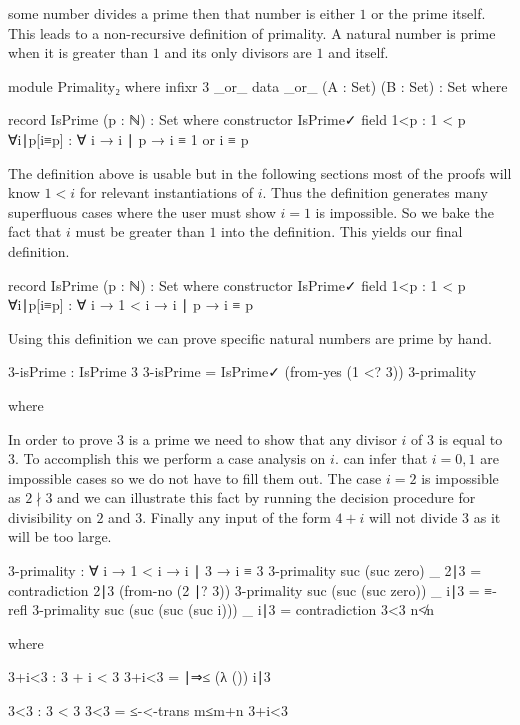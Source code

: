 \documentclass[./Thesis.tex]{subfiles}
\begin{document}
some number divides a prime then that number is either $1$ or the prime itself.
This leads to a non-recursive definition of primality. A natural number is prime
when it is greater than $1$ and its only divisors are $1$ and itself.
\begin{code}[hide]
  module Primality₂ where
    infixr 3 _or_
    data _or_ (A : Set) (B : Set) : Set where
\end{code}
\begin{code}
    record IsPrime (p : ℕ) : Set where
      constructor IsPrime✓
      field
        1<p : 1 < p
        ∀i∣p[i≡p] : ∀ {i} → i ∣ p → i ≡ 1 or i ≡ p
\end{code}
The definition above is usable but in the following sections most of the proofs
will know $1 < i$ for relevant instantiations of $i$. Thus the definition
generates many superfluous cases where the user must show $i = 1$ is impossible.
So we bake the fact that $i$ must be greater than $1$ into the definition. This
yields our final definition.
\begin{code}
  record IsPrime (p : ℕ) : Set where
    constructor IsPrime✓
    field
      1<p : 1 < p
      ∀i∣p[i≡p] : ∀ {i} → 1 < i → i ∣ p → i ≡ p
\end{code}
Using this definition we can prove specific natural numbers are prime by hand.
\begin{code}
  3-isPrime : IsPrime 3
  3-isPrime = IsPrime✓ (from-yes (1 <? 3)) 3-primality
\end{code}
\begin{code}[hide]
    where
\end{code}
In order to prove $3$ is a prime we need to show that any divisor $i$ of $3$ is
equal to $3$. To accomplish this we perform a case analysis on $i$. \Agda{} can
infer that $i = 0, 1$ are impossible cases so we do not have to fill them out.
The case $i = 2$ is impossible as $2 \nmid 3$ and we can illustrate this fact by
running the decision procedure for divisibility on $2$ and $3$. Finally any
input of the form $4 + i$ will not divide $3$ as it will be too large.
\begin{code}
    3-primality : ∀ {i} → 1 < i → i ∣ 3 → i ≡ 3
    3-primality {suc (suc zero)} _ 2∣3 = contradiction 2∣3 (from-no (2 ∣? 3))
    3-primality {suc (suc (suc zero))} _ i∣3 = ≡-refl
    3-primality {suc (suc (suc (suc i)))} _ i∣3 = contradiction 3<3 n≮n
\end{code}
\begin{code}[hide]
      where
\end{code}
\begin{code}
      3+i<3 : 3 + i < 3
      3+i<3 = ∣⇒≤ (λ ()) i∣3

      3<3 : 3 < 3
      3<3 = ≤-<-trans m≤m+n 3+i<3
\end{code}
\end{document}
